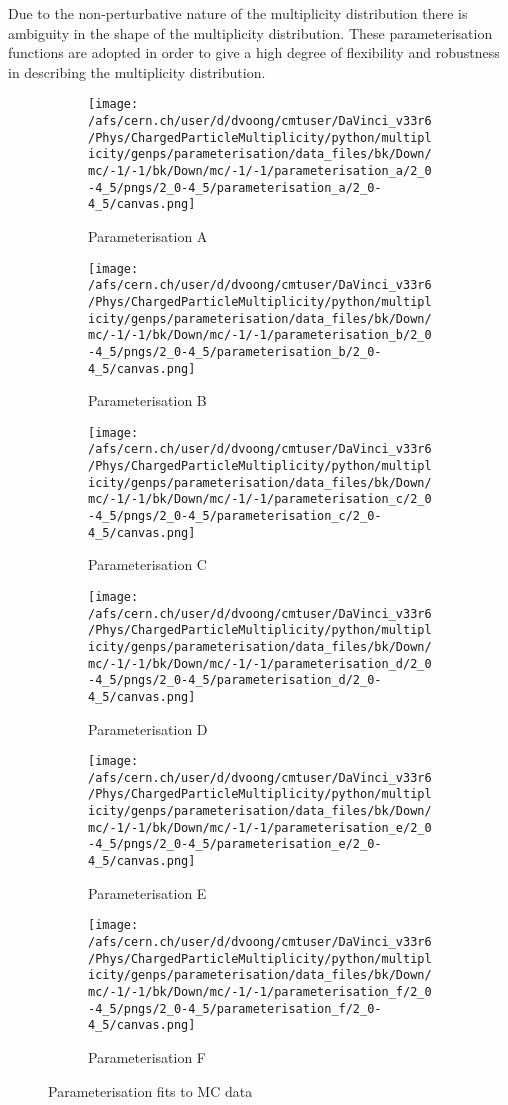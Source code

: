 Due to the non-perturbative nature of the multiplicity distribution there is ambiguity in the shape of the multiplicity distribution. These parameterisation functions are adopted in order to give a high degree of flexibility and robustness in describing the multiplicity distribution.

\begin{figure}[h]
	\centering
	\begin{subfigure}{0.49\textwidth}
		\texttt{[image: /afs/cern.ch/user/d/dvoong/cmtuser/DaVinci\_v33r6/Phys/ChargedParticleMultiplicity/python/multiplicity/genps/parameterisation/data\_files/bk/Down/mc/-1/-1/bk/Down/mc/-1/-1/parameterisation\_a/2\_0-4\_5/pngs/2\_0-4\_5/parameterisation\_a/2\_0-4\_5/canvas.png]}
		\caption{Parameterisation A}
		\label{}
	\end{subfigure}
	\begin{subfigure}{0.49\textwidth}
		\texttt{[image: /afs/cern.ch/user/d/dvoong/cmtuser/DaVinci\_v33r6/Phys/ChargedParticleMultiplicity/python/multiplicity/genps/parameterisation/data\_files/bk/Down/mc/-1/-1/bk/Down/mc/-1/-1/parameterisation\_b/2\_0-4\_5/pngs/2\_0-4\_5/parameterisation\_b/2\_0-4\_5/canvas.png]}
		\caption{Parameterisation B}
		\label{}
	\end{subfigure}
	\begin{subfigure}{0.49\textwidth}
		\texttt{[image: /afs/cern.ch/user/d/dvoong/cmtuser/DaVinci\_v33r6/Phys/ChargedParticleMultiplicity/python/multiplicity/genps/parameterisation/data\_files/bk/Down/mc/-1/-1/bk/Down/mc/-1/-1/parameterisation\_c/2\_0-4\_5/pngs/2\_0-4\_5/parameterisation\_c/2\_0-4\_5/canvas.png]}
		\caption{Parameterisation C}
		\label{}
	\end{subfigure}
	\begin{subfigure}{0.49\textwidth}
		\texttt{[image: /afs/cern.ch/user/d/dvoong/cmtuser/DaVinci\_v33r6/Phys/ChargedParticleMultiplicity/python/multiplicity/genps/parameterisation/data\_files/bk/Down/mc/-1/-1/bk/Down/mc/-1/-1/parameterisation\_d/2\_0-4\_5/pngs/2\_0-4\_5/parameterisation\_d/2\_0-4\_5/canvas.png]}
		\caption{Parameterisation D}
		\label{}
	\end{subfigure}
	\begin{subfigure}{0.49\textwidth}
		\texttt{[image: /afs/cern.ch/user/d/dvoong/cmtuser/DaVinci\_v33r6/Phys/ChargedParticleMultiplicity/python/multiplicity/genps/parameterisation/data\_files/bk/Down/mc/-1/-1/bk/Down/mc/-1/-1/parameterisation\_e/2\_0-4\_5/pngs/2\_0-4\_5/parameterisation\_e/2\_0-4\_5/canvas.png]}
		\caption{Parameterisation E}
		\label{}
	\end{subfigure}
	\begin{subfigure}{0.49\textwidth}
		\texttt{[image: /afs/cern.ch/user/d/dvoong/cmtuser/DaVinci\_v33r6/Phys/ChargedParticleMultiplicity/python/multiplicity/genps/parameterisation/data\_files/bk/Down/mc/-1/-1/bk/Down/mc/-1/-1/parameterisation\_f/2\_0-4\_5/pngs/2\_0-4\_5/parameterisation\_f/2\_0-4\_5/canvas.png]}
		\caption{Parameterisation F}
		\label{}
	\end{subfigure}
	\caption{Parameterisation fits to MC data}
	\label{fig: parameterisation fits}
\end{figure}
